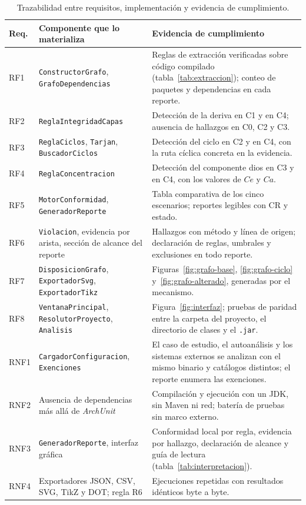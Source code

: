 \begin{table}[H]
\centering
\caption{Trazabilidad entre requisitos, implementación y evidencia de cumplimiento.}
\label{tab:trazabilidadReq}
\footnotesize
\begin{tabularx}{\textwidth}{p{1.2cm}p{4.2cm}X}
\toprule
\textbf{Req.} & \textbf{Componente que lo materializa} & \textbf{Evidencia de cumplimiento} \\
\midrule
RF1 & \texttt{ConstructorGrafo}, \texttt{GrafoDependencias} & Reglas de extracción verificadas sobre código compilado (tabla~\ref{tab:extraccion}); conteo de paquetes y dependencias en cada reporte. \\
\midrule
RF2 & \texttt{ReglaIntegridadCapas} & Detección de la deriva en C1 y en C4; ausencia de hallazgos en C0, C2 y C3. \\
\midrule
RF3 & \texttt{ReglaCiclos}, \texttt{Tarjan}, \texttt{BuscadorCiclos} & Detección del ciclo en C2 y en C4, con la ruta cíclica concreta en la evidencia. \\
\midrule
RF4 & \texttt{ReglaConcentracion} & Detección del componente dios en C3 y en C4, con los valores de $Ce$ y $Ca$. \\
\midrule
RF5 & \texttt{MotorConformidad}, \texttt{GeneradorReporte} & Tabla comparativa de los cinco escenarios; reportes legibles con CR y estado. \\
\midrule
RF6 & \texttt{Violacion}, evidencia por arista, sección de alcance del reporte & Hallazgos con método y línea de origen; declaración de reglas, umbrales y exclusiones en todo reporte. \\
\midrule
RF7 & \texttt{DisposicionGrafo}, \texttt{ExportadorSvg}, \texttt{ExportadorTikz} & Figuras~\ref{fig:grafo-base}, \ref{fig:grafo-ciclo} y~\ref{fig:grafo-alterado}, generadas por el mecanismo. \\
\midrule
RF8 & \texttt{VentanaPrincipal}, \texttt{ResolutorProyecto}, \texttt{Analisis} & Figura~\ref{fig:interfaz}; pruebas de paridad entre la carpeta del proyecto, el directorio de clases y el \texttt{.jar}. \\
\midrule
RNF1 & \texttt{CargadorConfiguracion}, \texttt{Exenciones} & El caso de estudio, el autoanálisis y los sistemas externos se analizan con el mismo binario y catálogos distintos; el reporte enumera las exenciones. \\
\midrule
RNF2 & Ausencia de dependencias más allá de \textit{ArchUnit} & Compilación y ejecución con un JDK, sin Maven ni red; batería de pruebas sin marco externo. \\
\midrule
RNF3 & \texttt{GeneradorReporte}, interfaz gráfica & Conformidad local por regla, evidencia por hallazgo, declaración de alcance y guía de lectura (tabla~\ref{tab:interpretacion}). \\
\midrule
RNF4 & Exportadores JSON, CSV, SVG, TikZ y DOT; regla R6 & Ejecuciones repetidas con resultados idénticos byte a byte. \\
\bottomrule
\end{tabularx}
\end{table}

